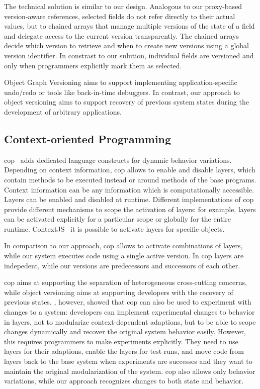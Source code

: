 The technical solution is similar to our design.
Analogous to our proxy-based version-aware references, selected fields do not refer directly to their actual values, but to chained arrays that manage multiple versions of the state of a field and delegate access to the current version transparently.
The chained arrays decide which version to retrieve and when to create new versions using a global version identifier.
In constrast to our sulution, individual fields are versioned and only when programmers explicitly mark them as selected.

Object Graph Versioning aims to support implementing application-specific undo/redo or tools like back-in-time debuggers.
In contrast, our approach to object versioning aims to support recovery of previous system states during the development of arbitrary applications.


\subsection{Context-oriented Programming}

\ac{cop}~\cite{Hirschfeld2008COP,Appeltauer2009CCP} adds dedicated language constructs for dynamic behavior variations.
Depending on context information, \ac{cop} allows to enable and disable layers, which contain methods to be executed instead or around methods of the base programs.
Context information can be any information which is computationally accessible.
Layers can be enabled and disabled at runtime.
Different implementations of \ac{cop} provide different mechanisms to scope the activation of layers: for example, layers can be activated explicitly for a particular scope or globally for the entire runtime.
ContextJS~\cite{Lincke2011OIC} it is possible to activate layers for specific objects.

In comparison to our approach, \ac{cop} allows to activate combinations of layers, while our system executes code using a single active version.
In \ac{cop} layers are indepedent, while our versions are predecessors and successors of each other.

\ac{cop} aims at supporting the separation of heterogeneous cross-cutting concerns, while object versioning aims at supporting developers with the recovery of previous states.
\cite{Lincke2012SCS}, however, showed that \ac{cop} can also be used to experiment with changes to a system: developers can implement experimental changes to behavior in layers, not to modularize context-dependent adaptions, but to be able to scope changes dynamically and recover the original system behavior easily.
However, this requires programmers to make experiments explicitly.
They need to use layers for their adaptions, enable the layers for test runs, and move code from layers back to the base system when experiments are successes and they want to maintain the original modularization of the system.
\ac{cop} also allows only behavior variations, while our approach recognizes changes to both state and behavior.


